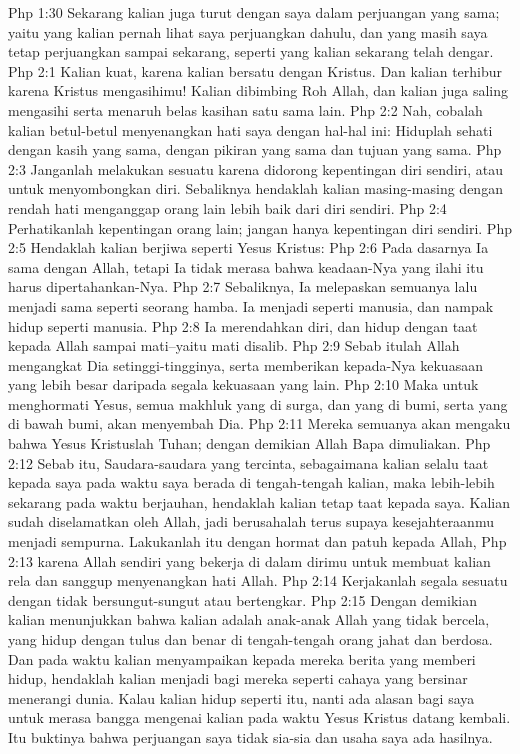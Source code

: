Php 1:30  Sekarang kalian juga turut dengan saya dalam perjuangan yang sama; yaitu yang kalian pernah lihat saya perjuangkan dahulu, dan yang masih saya tetap perjuangkan sampai sekarang, seperti yang kalian sekarang telah dengar.
Php 2:1  Kalian kuat, karena kalian bersatu dengan Kristus. Dan kalian terhibur karena Kristus mengasihimu! Kalian dibimbing Roh Allah, dan kalian juga saling mengasihi serta menaruh belas kasihan satu sama lain.
Php 2:2  Nah, cobalah kalian betul-betul menyenangkan hati saya dengan hal-hal ini: Hiduplah sehati dengan kasih yang sama, dengan pikiran yang sama dan tujuan yang sama.
Php 2:3  Janganlah melakukan sesuatu karena didorong kepentingan diri sendiri, atau untuk menyombongkan diri. Sebaliknya hendaklah kalian masing-masing dengan rendah hati menganggap orang lain lebih baik dari diri sendiri.
Php 2:4  Perhatikanlah kepentingan orang lain; jangan hanya kepentingan diri sendiri.
Php 2:5  Hendaklah kalian berjiwa seperti Yesus Kristus:
Php 2:6  Pada dasarnya Ia sama dengan Allah, tetapi Ia tidak merasa bahwa keadaan-Nya yang ilahi itu harus dipertahankan-Nya.
Php 2:7  Sebaliknya, Ia melepaskan semuanya lalu menjadi sama seperti seorang hamba. Ia menjadi seperti manusia, dan nampak hidup seperti manusia.
Php 2:8  Ia merendahkan diri, dan hidup dengan taat kepada Allah sampai mati--yaitu mati disalib.
Php 2:9  Sebab itulah Allah mengangkat Dia setinggi-tingginya, serta memberikan kepada-Nya kekuasaan yang lebih besar daripada segala kekuasaan yang lain.
Php 2:10  Maka untuk menghormati Yesus, semua makhluk yang di surga, dan yang di bumi, serta yang di bawah bumi, akan menyembah Dia.
Php 2:11  Mereka semuanya akan mengaku bahwa Yesus Kristuslah Tuhan; dengan demikian Allah Bapa dimuliakan.
Php 2:12  Sebab itu, Saudara-saudara yang tercinta, sebagaimana kalian selalu taat kepada saya pada waktu saya berada di tengah-tengah kalian, maka lebih-lebih sekarang pada waktu berjauhan, hendaklah kalian tetap taat kepada saya. Kalian sudah diselamatkan oleh Allah, jadi berusahalah terus supaya kesejahteraanmu menjadi sempurna. Lakukanlah itu dengan hormat dan patuh kepada Allah,
Php 2:13  karena Allah sendiri yang bekerja di dalam dirimu untuk membuat kalian rela dan sanggup menyenangkan hati Allah.
Php 2:14  Kerjakanlah segala sesuatu dengan tidak bersungut-sungut atau bertengkar.
Php 2:15  Dengan demikian kalian menunjukkan bahwa kalian adalah anak-anak Allah yang tidak bercela, yang hidup dengan tulus dan benar di tengah-tengah orang jahat dan berdosa. Dan pada waktu kalian menyampaikan kepada mereka berita yang memberi hidup, hendaklah kalian menjadi bagi mereka seperti cahaya yang bersinar menerangi dunia. Kalau kalian hidup seperti itu, nanti ada alasan bagi saya untuk merasa bangga mengenai kalian pada waktu Yesus Kristus datang kembali. Itu buktinya bahwa perjuangan saya tidak sia-sia dan usaha saya ada hasilnya.
